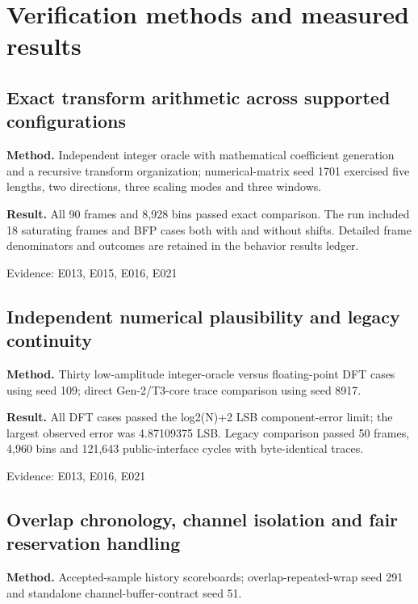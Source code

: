 \documentclass[11pt,a4paper]{article}
\begin{document}
\section{Verification methods and measured results}

\subsection{Exact transform arithmetic across supported configurations}

\textbf{Method.} Independent integer oracle with mathematical coefficient generation and a recursive transform organization; numerical-matrix seed 1701 exercised five lengths,\allowbreak{} two directions,\allowbreak{} three scaling modes and three windows.

\textbf{Result.} All 90 frames and 8,\allowbreak{}928 bins passed exact comparison. The run included 18 saturating frames and BFP cases both with and without shifts. Detailed frame denominators and outcomes are retained in the behavior results ledger.

{\small Evidence: E013,\allowbreak{} E015,\allowbreak{} E016,\allowbreak{} E021}

\subsection{Independent numerical plausibility and legacy continuity}

\textbf{Method.} Thirty low-amplitude integer-oracle versus floating-point DFT cases using seed 109; direct Gen-2/\allowbreak{}T3-core trace comparison using seed 8917.

\textbf{Result.} All DFT cases passed the log2(\allowbreak{}N)\allowbreak{}+\allowbreak{}2 LSB component-error limit; the largest observed error was 4.87109375 LSB. Legacy comparison passed 50 frames,\allowbreak{} 4,\allowbreak{}960 bins and 121,\allowbreak{}643 public-interface cycles with byte-identical traces.

{\small Evidence: E013,\allowbreak{} E016,\allowbreak{} E021}

\subsection{Overlap chronology,\allowbreak{} channel isolation and fair reservation handling}

\textbf{Method.} Accepted-sample history scoreboards; overlap-repeated-wrap seed 291 and standalone channel-buffer-contract seed 51.
\end{document}
